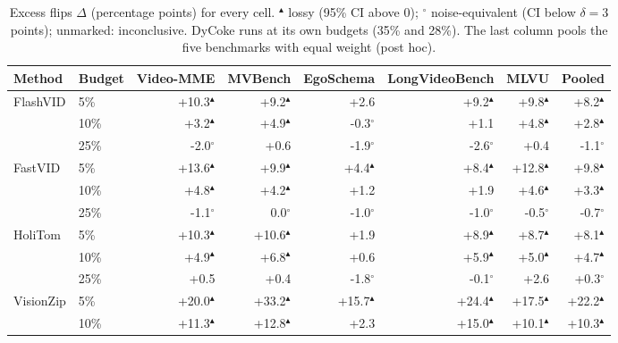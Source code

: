 \begin{table}[t]
\centering
\caption{Excess flips $\Delta$ (percentage points) for every cell. $^{\blacktriangle}$ lossy (95\% CI above 0); $^{\circ}$ noise-equivalent (CI below $\delta=3$ points); unmarked: inconclusive. DyCoke runs at its own budgets (35\% and 28\%). The last column pools the five benchmarks with equal weight (post hoc).}
\label{tab:cells}
\small
\begin{tabular}{llrrrrrr}
\toprule
Method & Budget & Video-MME & MVBench & EgoSchema & LongVideoBench & MLVU & Pooled \\
\midrule
FlashVID & 5\% & +10.3$^{\blacktriangle}$ & +9.2$^{\blacktriangle}$ & +2.6 & +9.2$^{\blacktriangle}$ & +9.8$^{\blacktriangle}$ & +8.2$^{\blacktriangle}$ \\
 & 10\% & +3.2$^{\blacktriangle}$ & +4.9$^{\blacktriangle}$ & -0.3$^{\circ}$ & +1.1 & +4.8$^{\blacktriangle}$ & +2.8$^{\blacktriangle}$ \\
 & 25\% & -2.0$^{\circ}$ & +0.6 & -1.9$^{\circ}$ & -2.6$^{\circ}$ & +0.4 & -1.1$^{\circ}$ \\
\addlinespace[2pt]
FastVID & 5\% & +13.6$^{\blacktriangle}$ & +9.9$^{\blacktriangle}$ & +4.4$^{\blacktriangle}$ & +8.4$^{\blacktriangle}$ & +12.8$^{\blacktriangle}$ & +9.8$^{\blacktriangle}$ \\
 & 10\% & +4.8$^{\blacktriangle}$ & +4.2$^{\blacktriangle}$ & +1.2 & +1.9 & +4.6$^{\blacktriangle}$ & +3.3$^{\blacktriangle}$ \\
 & 25\% & -1.1$^{\circ}$ & 0.0$^{\circ}$ & -1.0$^{\circ}$ & -1.0$^{\circ}$ & -0.5$^{\circ}$ & -0.7$^{\circ}$ \\
\addlinespace[2pt]
HoliTom & 5\% & +10.3$^{\blacktriangle}$ & +10.6$^{\blacktriangle}$ & +1.9 & +8.9$^{\blacktriangle}$ & +8.7$^{\blacktriangle}$ & +8.1$^{\blacktriangle}$ \\
 & 10\% & +4.9$^{\blacktriangle}$ & +6.8$^{\blacktriangle}$ & +0.6 & +5.9$^{\blacktriangle}$ & +5.0$^{\blacktriangle}$ & +4.7$^{\blacktriangle}$ \\
 & 25\% & +0.5 & +0.4 & -1.8$^{\circ}$ & -0.1$^{\circ}$ & +2.6 & +0.3$^{\circ}$ \\
\addlinespace[2pt]
VisionZip & 5\% & +20.0$^{\blacktriangle}$ & +33.2$^{\blacktriangle}$ & +15.7$^{\blacktriangle}$ & +24.4$^{\blacktriangle}$ & +17.5$^{\blacktriangle}$ & +22.2$^{\blacktriangle}$ \\
 & 10\% & +11.3$^{\blacktriangle}$ & +12.8$^{\blacktriangle}$ & +2.3 & +15.0$^{\blacktriangle}$ & +10.1$^{\blacktriangle}$ & +10.3$^{\blacktriangle}$ \\

\end{tabular}
\end{table}
